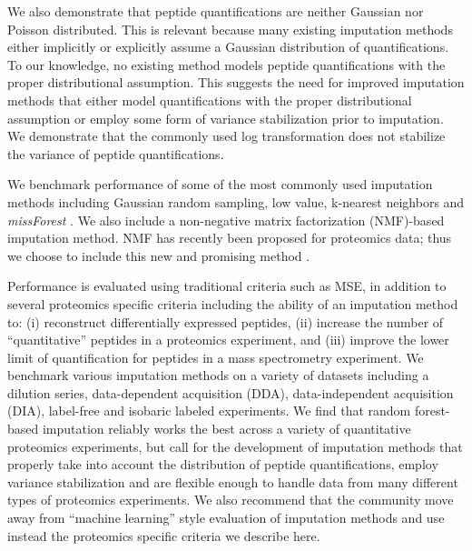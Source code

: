 \documentclass{article}
\begin{document}
We also demonstrate that peptide quantifications are neither Gaussian nor Poisson distributed. This is relevant because many existing imputation methods either implicitly or explicitly assume a Gaussian distribution of quantifications. To our knowledge, no existing method models peptide quantifications with the proper distributional assumption. This suggests the need for improved imputation methods that either model quantifications with the proper distributional assumption or employ some form of variance stabilization prior to imputation. We demonstrate that the commonly used log transformation does not stabilize the variance of peptide quantifications. 

We benchmark performance of some of the most commonly used imputation methods including Gaussian random sampling, low value, k-nearest neighbors and \textit{missForest} \cite{knn-impute, missForest}. We also include a non-negative matrix factorization (NMF)-based imputation method. NMF has recently been proposed for proteomics data; thus we choose to include this new and promising method \cite{ms-impute, nmf-metabolomics}. 

Performance is evaluated using traditional criteria such as MSE, in addition to several proteomics specific criteria including the ability of an imputation method to: (i) reconstruct differentially expressed peptides, (ii) increase the number of “quantitative” peptides in a proteomics experiment, and (iii) improve the lower limit of quantification for peptides in a mass spectrometry experiment. We benchmark various imputation methods on a variety of datasets including a dilution series, data-dependent acquisition (DDA), data-independent acquisition (DIA), label-free and isobaric labeled experiments. We find that random forest-based imputation \cite{missForest} reliably works the best across a variety of quantitative proteomics experiments, but call for the development of imputation methods that properly take into account the distribution of peptide quantifications, employ variance stabilization and are flexible enough to handle data from many different types of proteomics experiments. We also recommend that the community move away from “machine learning” style evaluation of imputation methods and use instead the proteomics specific criteria we describe here. 
\end{document}
